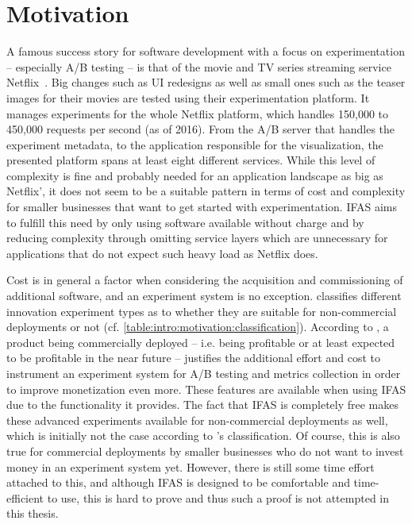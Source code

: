 
\section{Motivation}
\label{sec:intro:motivation}

A famous success story for software development with a focus on experimentation -- especially A/B testing -- is that of the movie and TV series streaming service Netflix~\cite{WEB:Netflix:2016}.
Big changes such as UI redesigns as well as small ones such as the teaser images for their movies are tested using their experimentation platform.
It manages experiments for the whole Netflix platform, which handles 150,000 to 450,000 requests per second (as of 2016).
From the A/B server that handles the experiment metadata, to the application responsible for the visualization, the presented platform spans at least eight different services.
While this level of complexity is fine and probably needed for an application landscape as big as Netflix', it does not seem to be a suitable pattern in terms of cost and complexity for smaller businesses that want to get started with experimentation.
\ac{IFAS} aims to fulfill this need by only using software available without charge and by reducing complexity through omitting service layers which are unnecessary for applications that do not expect such heavy load as Netflix does.

Cost is in general a factor when considering the acquisition and commissioning of additional software, and an experiment system is no exception.
\citet{Bosch2012} classifies different innovation experiment types as to whether they are suitable for non-commercial deployments or not (cf. \cref{table:intro:motivation:classification}).
According to \citeauthor{Bosch2012}, a product being commercially deployed -- i.e. being profitable or at least expected to be profitable in the near future -- justifies the additional effort and cost to instrument an experiment system for A/B testing and metrics collection in order to improve monetization even more.
These features are available when using \ac{IFAS} due to the functionality it provides.
The fact that \ac{IFAS} is completely free makes these advanced experiments available for non-commercial deployments as well, which is initially not the case according to \citeauthor{Bosch2012}'s classification.
Of course, this is also true for commercial deployments by smaller businesses who do not want to invest money in an experiment system yet.
However, there is still some time effort attached to this, and although \ac{IFAS} is designed to be comfortable and time-efficient to use, this is hard to prove and thus such a proof is not attempted in this thesis.

